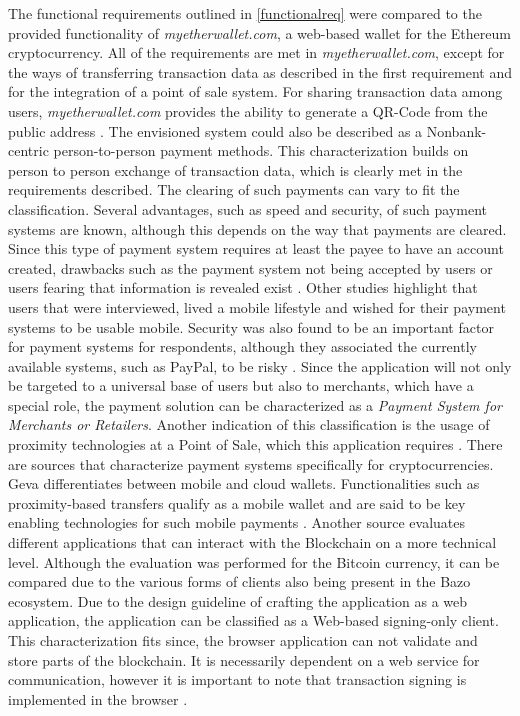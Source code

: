 The functional requirements outlined in \ref{functionalreq} were compared to %
the provided functionality of \textit{myetherwallet.com}, a web-based wallet for the Ethereum cryptocurrency. All of the requirements are met in \textit{myetherwallet.com}, except for the ways of transferring transaction data as described in the first requirement and for the integration of a point of sale system. For sharing transaction data among users, \textit{myetherwallet.com} provides the ability to generate a QR-Code from the public address \cite{myethwallet}. %
The envisioned system could also be described as a Nonbank-centric person-to-person payment methods. This characterization builds on person to person exchange of transaction data, which is clearly met in the requirements described. The clearing of such payments can vary to fit the classification. %
Several advantages, such as speed and security, of such payment systems are known, although this depends on the way that payments are cleared. Since this type of payment system requires at least the payee to have an account created, drawbacks such as the payment system not being accepted by users or users fearing that information is revealed exist \cite{p2ppayments}. 
Other studies highlight that users that were interviewed, lived a mobile lifestyle and wished for their payment systems to be usable mobile. Security was also found to be an important factor for payment systems for respondents, although they associated the currently available systems, such as PayPal, to be risky \cite{p2ppadoption}.
Since the application will not only be targeted to a universal base of users but also to merchants, which have a special role, the payment solution can be characterized as a  \textit{Payment System for Merchants or Retailers}.
Another indication of this classification is the usage of proximity technologies at a Point of Sale, which this application requires \cite{p2ptypes}.
There are sources that characterize payment systems specifically for cryptocurrencies. Geva differentiates between mobile and cloud wallets. Functionalities such as proximity-based transfers qualify as a mobile wallet and are said to be key enabling technologies for such mobile payments \cite{bitcoinmobile}.
Another source evaluates different applications that can interact with the Blockchain on a more technical level. Although the evaluation was performed for the Bitcoin currency, it can be compared due to the various forms of clients also being present in the Bazo ecosystem.
Due to the design guideline of crafting the application as a web application, the application can be classified as a Web-based signing-only client. This characterization fits since, the browser application can not validate and store parts of the blockchain. It is necessarily dependent on a web service for communication, however it is important to note that transaction signing is implemented in the browser \cite{bitcoinclients}. 

